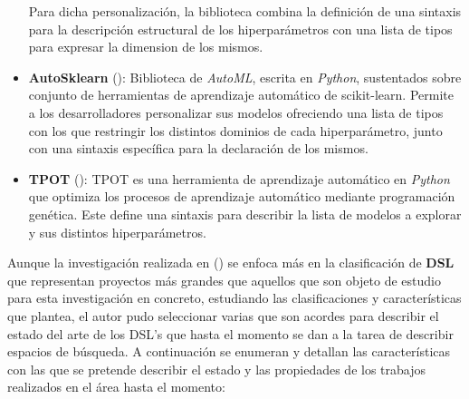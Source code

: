 \begin{itemize}
          Para dicha personalización, la biblioteca combina la definición de una sintaxis para la descripción
          estructural de los hiperparámetros con una lista de tipos para expresar la dimension de los
          mismos.
    \item {\bf AutoSklearn} (\cite{autosklearn}): Biblioteca de {\it AutoML}, escrita en {\it Python}, sustentados sobre
          conjunto de herramientas de aprendizaje automático de scikit-learn. Permite a los desarrolladores
          personalizar sus modelos ofreciendo una lista de tipos con los que restringir los distintos dominios
          de cada hiperparámetro, junto con una sintaxis específica para la declaración de los mismos.
    \item {\bf TPOT} (\cite{tpot}): TPOT es una herramienta de aprendizaje automático en {\it Python} que optimiza los
          procesos de aprendizaje automático mediante programación genética. Este define una sintaxis para
          describir la lista de modelos a explorar y sus distintos hiperparámetros.
\end{itemize}

Aunque la investigación realizada en (\cite{langlois2007dsl}) se enfoca más en la clasificación de {\bf DSL} que
representan proyectos más grandes que aquellos que son objeto de estudio para esta
investigación en concreto, estudiando las clasificaciones y características que plantea,
el autor pudo seleccionar varias que son acordes para describir el estado del arte
de los DSL's que hasta el momento se dan a la tarea de describir espacios de búsqueda.
A continuación se enumeran y detallan las características con las que se pretende
describir el estado y las propiedades de los trabajos realizados en el área hasta el
momento:

